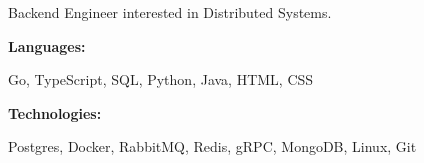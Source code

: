 \documentclass[9pt]{developercv} %
\begin{document}
\begin{minipage}[t]{0.46\textwidth}
	\vspace{-6pt}
Backend Engineer interested in Distributed Systems. 
\end{minipage}
\hfill %
\begin{minipage}[t]{0.465\textwidth}
    \vspace{-6pt}
    
    \begin{minipage}[t]{0.2\textwidth}
        \textbf{Languages:}
    \end{minipage}
    \hfill
    \begin{minipage}[t]{0.73\textwidth}
      Go, TypeScript, SQL, Python, Java, HTML, CSS  
    \end{minipage}
    \vspace{4mm}
    
    \begin{minipage}[t]{0.2\textwidth}
        \textbf{Technologies:}
    \end{minipage}
    \hfill
    \begin{minipage}[t]{0.73\textwidth}
      Postgres, Docker, RabbitMQ, Redis, gRPC, MongoDB, Linux, Git
    \end{minipage}
    
\end{minipage}
\end{document}
